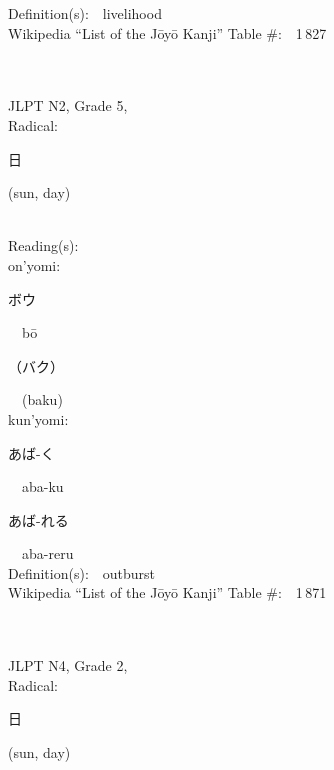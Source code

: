 \begin{multicols}{2}
Definition(s):\ \ livelihood \\
Wikipedia ``List of the J\=oy\=o Kanji'' Table \#:\ \ 1\,827 \\
\ \ \\
{\fontsize{34pt}{40pt}  }\ \ \\  %
{JLPT N2, Grade 5, \\Radical:\ \ {\begin{CJK}{UTF8}{min} 日 \end{CJK}} (sun, day) } \\
Reading(s):\ \ \\
{\hspace*{1em}}on'yomi:\ \ \\
{\hspace*{2em}}{\begin{CJK}{UTF8}{min} ボウ \end{CJK}}\ \ b\=o\ \ \\
{\hspace*{2em}}{\begin{CJK}{UTF8}{min} （バク） \end{CJK}}\ \ (baku)\ \ \\
{\hspace*{1em}}kun'yomi:\ \ \\
{\hspace*{2em}}{\begin{CJK}{UTF8}{min} あば-く \end{CJK}}\ \ aba-ku\ \ \\
{\hspace*{2em}}{\begin{CJK}{UTF8}{min} あば-れる \end{CJK}}\ \ aba-reru\ \ \\
Definition(s):\ \ outburst \\
Wikipedia ``List of the J\=oy\=o Kanji'' Table \#:\ \ 1\,871 \\
\ \ \\
{\fontsize{34pt}{40pt}  }\ \ \\  %
{JLPT N4, Grade 2, \\Radical:\ \ {\begin{CJK}{UTF8}{min} 日 \end{CJK}} (sun, day) } \\

\end{multicols}
